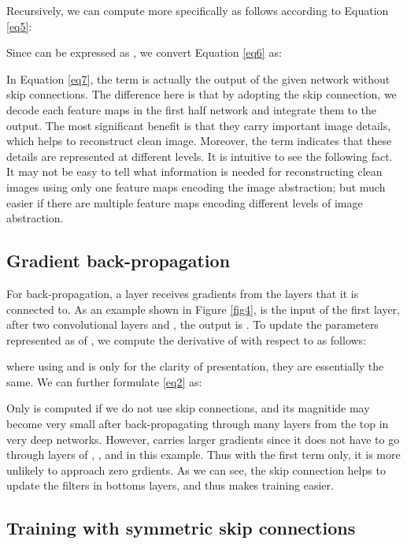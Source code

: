 \documentclass[10pt,journal,compsoc]{IEEEtran}
\begin{document}
Recursively, we can compute  more specifically as follows according to Equation \eqref{eq5}:

Since  can be expressed as , we convert Equation \eqref{eq6} as:

In Equation \eqref{eq7}, the term  is actually the output
of the given network without skip connections. The difference here is that by adopting
the skip connection, we decode each feature maps  in the first half
network and integrate them to the output. The most significant benefit is that they carry
important image details, which helps to reconstruct clean image. Moreover, the term
 indicates that these details are represented at
different levels. It is intuitive  to see the following fact. It may not be easy to tell what information
 is needed for
reconstructing clean images using only one feature maps encoding the image abstraction;
but much easier if there are multiple feature maps encoding different levels of image abstraction.



\subsection{Gradient back-propagation}

For back-propagation, a layer receives gradients from the layers that it is connected to.
As an example shown in Figure \ref{fig4},  is the input of the first layer,
after two convolutional layers  and , the output is . To update the parameters
represented as  of , we compute the derivative of  with
respect to  as follows:

where using  and  is only for the clarity of presentation, they are essentially
the same. We can further formulate \eqref{eq2} as:

Only  is computed if we do not use skip connections, and its magnitide
 may become very
small after back-propagating through many layers from the top in very deep networks.
However, 
carries larger gradients since it does not have to go through layers of , ,  and  in this example.
Thus with the first term only, it is more unlikely to approach zero grdients.
 As we can see, the skip connection helps to update
the filters in bottoms layers, and thus makes training easier.

\subsection{Training with symmetric skip connections}
\end{document}
